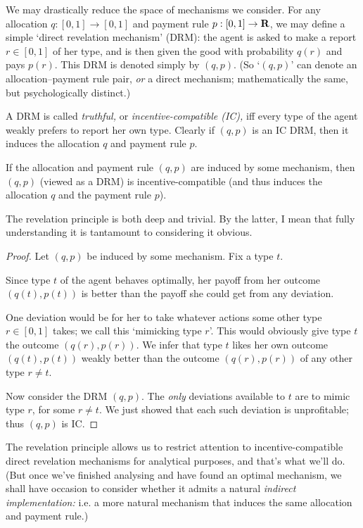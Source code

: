 We may drastically reduce the space of mechanisms we consider.
For any allocation $q : [0,1] \to [0,1]$ and payment rule $p : [0,1] \to \mathbf{R}$,
we may define a simple `direct revelation mechanism' (DRM):
the agent is asked to make a report $r \in [0,1]$ of her type,
and is then given the good with probability $q(r)$ and pays $p(r)$.
This DRM is denoted simply by $(q,p)$.
(So `$(q,p)$' can denote an allocation--payment rule pair,
\emph{or} a direct mechanism; mathematically the same, but psychologically distinct.)

A DRM is called \emph{truthful,} or \emph{incentive-compatible (IC),}
iff every type of the agent weakly prefers to report her own type.
Clearly if $(q,p)$ is an IC DRM, then it induces the allocation $q$ and payment rule $p$.

\begin{namedthm}
	\label{observation:rev}
	If the allocation and payment rule $(q,p)$ are induced by some mechanism,
	then $(q,p)$ (viewed as a DRM) is incentive-compatible
	(and thus induces the allocation $q$ and the payment rule $p$).
\end{namedthm}

The revelation principle is both deep and trivial.
By the latter, I mean that fully understanding it is tantamount to considering it obvious.

\begin{proof}
	Let $(q,p)$ be induced by some mechanism.
	Fix a type $t$.

	Since type $t$ of the agent behaves optimally,
	her payoff from her outcome $(q(t),p(t))$ is better than the payoff she could get from any deviation.

	One deviation would be for her to take whatever actions some other type $r \in [0,1]$ takes; we call this `mimicking type $r$'.
	This would obviously give type $t$ the outcome $(q(r),p(r))$.
	We infer that type $t$ likes her own outcome $(q(t),p(t))$ weakly better than the outcome $(q(r),p(r))$ of any other type $r \neq t$.

	Now consider the DRM $(q,p)$.
	The \emph{only} deviations available to $t$
	are to mimic type $r$, for some $r \neq t$.
	We just showed that each such deviation is unprofitable;
	thus $(q,p)$ is IC.
\end{proof}

The revelation principle allows us to restrict attention to incentive-compatible direct revelation mechanisms for analytical purposes, and that's what we'll do.
(But once we've finished analysing and have found an optimal mechanism,
we shall have occasion to consider whether it admits a natural \emph{indirect implementation:} i.e. a more natural mechanism that induces the same allocation and payment rule.)



